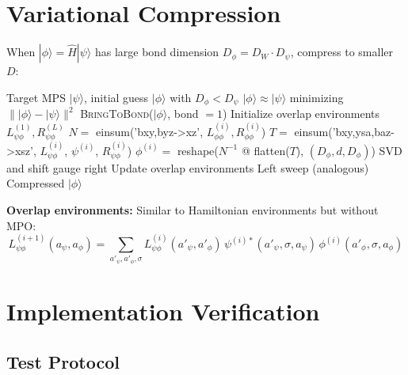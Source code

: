 \documentclass[aps,prb,onecolumn,scriptaddress]{revtex4-2}
\begin{document}
	\section{Variational Compression}
	
	When $|\phi\rangle = \hat{H}|\psi\rangle$ has large bond dimension $D_\phi = D_W \cdot D_\psi$, compress to smaller $D$:
	
	\begin{algorithm}[H]
		\caption{VariationalCompress}
		\begin{algorithmic}[1]
			\Require Target MPS $|\psi\rangle$, initial guess $|\phi\rangle$ with $D_\phi < D_\psi$
			\Ensure $|\phi\rangle \approx |\psi\rangle$ minimizing $\||\phi\rangle - |\psi\rangle\|^2$
			\State \textsc{BringToBond}($|\phi\rangle$, bond $= 1$)
			\State Initialize overlap environments $L_{\psi\phi}^{(1)}, R_{\psi\phi}^{(L)}$
			\State {}
			\State $N = $ einsum('bxy,byz->xz', $L_{\phi\phi}^{(i)}, R_{\phi\phi}^{(i)}$) 
			\State $T = $ einsum('bxy,ysa,baz->xsz', $L_{\psi\phi}^{(i)}$, $\psi^{(i)}$, $R_{\psi\phi}^{(i)}$)
			\State {}
			\State $\phi^{(i)} = $ reshape($N^{-1}$ @ flatten($T$), $(D_\phi, d, D_\phi)$)
			\State SVD and shift gauge right
			\State Update overlap environments
			\EndFor
			\State Left sweep (analogous)
			\EndWhile
			\State \Return Compressed $|\phi\rangle$
		\end{algorithmic}
	\end{algorithm}
	
	\textbf{Overlap environments:} Similar to Hamiltonian environments but without MPO:
	\begin{equation}
		L_{\psi\phi}^{(i+1)}(a_\psi, a_\phi) = \sum_{a'_\psi, a'_\phi, \sigma} 
		L_{\psi\phi}^{(i)}(a'_\psi, a'_\phi) \, 
		\psi^{(i)*}(a'_\psi, \sigma, a_\psi) \, 
		\phi^{(i)}(a'_\phi, \sigma, a_\phi)
	\end{equation}
	
	\section{Implementation Verification}
	
	\subsection{Test Protocol}
	
\end{document}
